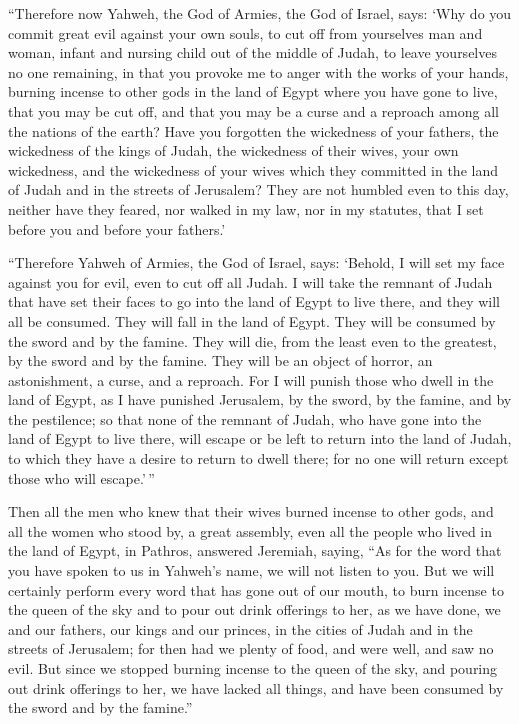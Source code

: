  ``Therefore now Yahweh, the God of Armies, the God of
Israel, says: `Why do you commit great evil against your own souls, to
cut off from yourselves man and woman, infant and nursing child out of
the middle of Judah, to leave yourselves no one remaining, 
in that you provoke me to anger with the works of your hands, burning
incense to other gods in the land of Egypt where you have gone to live,
that you may be cut off, and that you may be a curse and a reproach
among all the nations of the earth?  Have you forgotten the
wickedness of your fathers, the wickedness of the kings of Judah, the
wickedness of their wives, your own wickedness, and the wickedness of
your wives which they committed in the land of Judah and in the streets
of Jerusalem?  They are not humbled even to this day,
neither have they feared, nor walked in my law, nor in my statutes, that
I set before you and before your fathers.'

 ``Therefore Yahweh of Armies, the God of Israel, says:
`Behold, I will set my face against you for evil, even to cut off all
Judah.  I will take the remnant of Judah that have set
their faces to go into the land of Egypt to live there, and they will
all be consumed. They will fall in the land of Egypt. They will be
consumed by the sword and by the famine. They will die, from the least
even to the greatest, by the sword and by the famine. They will be an
object of horror, an astonishment, a curse, and a reproach.
 For I will punish those who dwell in the land of Egypt, as
I have punished Jerusalem, by the sword, by the famine, and by the
pestilence;  so that none of the remnant of Judah, who have
gone into the land of Egypt to live there, will escape or be left to
return into the land of Judah, to which they have a desire to return to
dwell there; for no one will return except those who will escape.'\,''

 Then all the men who knew that their wives burned incense
to other gods, and all the women who stood by, a great assembly, even
all the people who lived in the land of Egypt, in Pathros, answered
Jeremiah, saying,  ``As for the word that you have spoken
to us in Yahweh's name, we will not listen to you.  But we
will certainly perform every word that has gone out of our mouth, to
burn incense to the queen of the sky and to pour out drink offerings to
her, as we have done, we and our fathers, our kings and our princes, in
the cities of Judah and in the streets of Jerusalem; for then had we
plenty of food, and were well, and saw no evil.  But since
we stopped burning incense to the queen of the sky, and pouring out
drink offerings to her, we have lacked all things, and have been
consumed by the sword and by the famine.''


